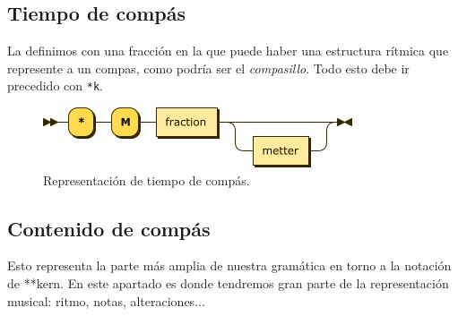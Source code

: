 \documentclass{article}
\begin{document}
    \subsection{Tiempo de compás}
    La definimos con una fracción en la que puede haber una estructura rítmica que represente a un compas, como podría ser
    el \textit{compasillo}. Todo esto debe ir precedido con \texttt{*k}.
    \begin{figure}[H]
        \centering
        \includegraphics[scale = 0.55]{figures_railroad/png/skern/timesignature.png}
        \caption{Representación de tiempo de compás.}
    \end{figure}

    \subsection{Contenido de compás}
    Esto representa la parte más amplia de nuestra gramática en torno a la notación de **kern. En este apartado es donde
    tendremos gran parte de la representación musical: ritmo, notas, alteraciones...
\end{document}
